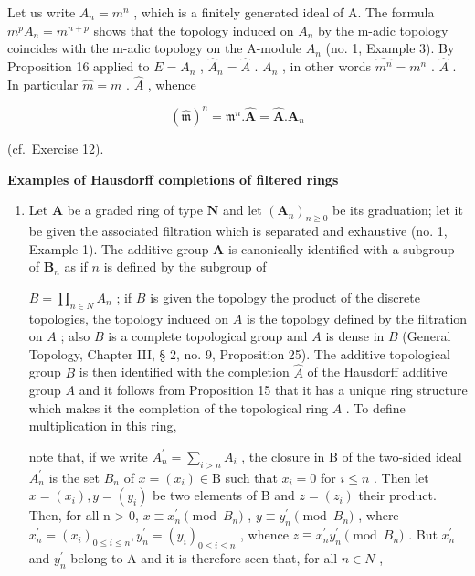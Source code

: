 Let us write \(A_{n} = m^{n}\) , which is a finitely generated ideal of A. The formula \(m^{p}A_{n} = m^{n+p}\) shows that the topology induced on \(A_{n}\) by the m-adic topology coincides with the m-adic topology on the A-module \(A_{n}\) (no. 1, Example 3). By Proposition 16 applied to \(E = A_{n}\) , \(\hat{A}_{n} = \hat{A}\) . \(A_{n}\) , in other words \(\widehat{m^{n}} = m^{n}\) . \(\hat{A}\) . In particular \(\hat{m} = m\) . \(\hat{A}\) , whence

\[
(\hat {\mathfrak {m}}) ^ {n} = \mathfrak {m} ^ {n}. \hat {\mathbf {A}} = \hat {\mathbf {A}}. \mathbf {A} _ {n}
\]

(cf.~Exercise 12).

\textbf{Examples of Hausdorff completions of filtered rings}\par

\begin{enumerate}
\def\labelenumi{(\arabic{enumi})}
\tightlist
\item
  Let \(\mathbf{A}\) be a graded ring of type \(\mathbf{N}\) and let \((\mathbf{A}_n)_{n\geqslant 0}\) be its graduation; let it be given the associated filtration which is separated and exhaustive (no. 1, Example 1). The additive group \(\mathbf{A}\) is canonically identified with a subgroup of \(\mathbf{B}_{n}\) as if \(n\) is defined by the subgroup of

\(B = \prod_{n \in N} A_n\) ; if \(B\) is given the topology the product of the discrete topologies, the topology induced on \(A\) is the topology defined by the filtration on \(A\) ; also \(B\) is a complete topological group and \(A\) is dense in \(B\) (General Topology, Chapter III, § 2, no. 9, Proposition 25). The additive topological group \(B\) is then identified with the completion \(\hat{A}\) of the Hausdorff additive group \(A\) and it follows from Proposition 15 that it has a unique ring structure which makes it the completion of the topological ring \(A\) . To define multiplication in this ring,

note that, if we write \(A_{n}^{\prime} = \sum_{i > n} A_{i}\) , the closure in B of the two-sided ideal \(A_{n}^{\prime}\) is the set \(B_{n}\) of \(x = (x_{i}) \in \mathrm{B}\) such that \(x_{i} = 0\) for \(i \leqslant n\) . Then let \(x = (x_{i}), y = (y_{i})\) be two elements of B and \(z = (z_{i})\) their product. Then, for all n \textgreater{} 0, \(x \equiv x_{n}^{\prime} \pmod{B_{n}}\) , \(y \equiv y_{n}^{\prime} \pmod{B_{n}}\) , where \(x_{n}^{\prime} = (x_{i})_{0 \leqslant i \leqslant n}, y_{n}^{\prime} = (y_{i})_{0 \leqslant i \leqslant n}\) , whence \(z \equiv x_{n}^{\prime} y_{n}^{\prime} \pmod{B_{n}}\) . But \(x_{n}^{\prime}\) and \(y_{n}^{\prime}\) belong to A and it is therefore seen that, for all \(n \in N\) ,


\end{enumerate}
